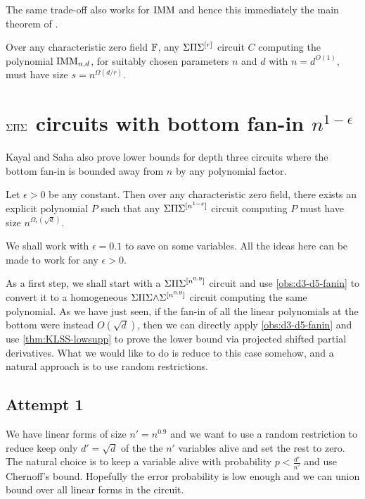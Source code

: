 The same trade-off also works for $\operatorname{\mathrm{IMM}}$ and hence this immediately  the main theorem of \cite{KayalSaha14}.

\begin{theorem}\label{thm:kaysaha-main}
  Over any characteristic zero field $\mathbb{F}$, any $\Sigma\Pi\Sigma^{[r]}$ circuit
  $C$ computing the polynomial $\operatorname{\mathrm{IMM}}_{n,d}$, for suitably chosen
  parameters $n$ and $d$ with $n = d^{O(1)}$, must have size $s =
  n^{\Omega(d/r)}$. 
\end{theorem}

\section{$\Sigma\Pi\Sigma$ circuits with bottom fan-in $n^{1-\epsilon}$}

Kayal and Saha \cite{KayalSaha14} also prove lower bounds for depth three circuits
where the bottom fan-in is bounded away from $n$ by any polynomial factor. 

\begin{theorem} Let $\epsilon > 0$ be any
  constant.
Then over any characteristic zero field, there exists an explicit polynomial $P$ such that any $\Sigma\Pi\Sigma^{[n^{1 - \varepsilon}]}$ circuit computing $P$ must have size $n^{\Omega_\epsilon(\sqrt{d})}$.
\end{theorem}

We shall work with $\epsilon = 0.1$ to save on some variables. All the ideas here can be made to work for any $\epsilon > 0$. 

As a first step, we shall start with a $\Sigma\Pi\Sigma^{[n^{0.9}]}$ circuit and use \autoref{obs:d3-d5-fanin} to convert it to a homogeneous $\Sigma\Pi\Sigma\mathord{\wedge}\Sigma^{[n^{0.9}]}$ circuit computing the same polynomial.
As we have just seen, if the fan-in of all the linear polynomials at the bottom were instead $O(\sqrt{d})$, then we can directly apply \autoref{obs:d3-d5-fanin} and use \autoref{thm:KLSS-lowsupp} to prove the lower bound via projected shifted partial derivatives.
What we would like to do is reduce to this case somehow, and a natural approach is to use random restrictions.

\subsection*{Attempt 1}

We have linear forms of size $n' = n^{0.9}$ and we want to use a random restriction to reduce keep only $d' = \sqrt{d}$ of the the $n'$ variables alive and set the rest to zero.
The natural choice is to keep a variable alive with probability $p < \frac{d'}{n'}$ and use Chernoff's bound. Hopefully the error probability is low enough and we can union bound over all linear forms in the circuit. 

